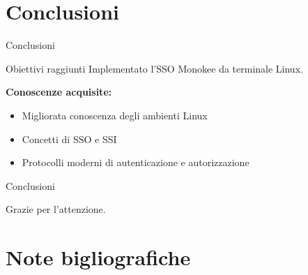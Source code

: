\documentclass{beamer}
\begin{document}
	\section{Conclusioni}
	\begin{frame}{Conclusioni}
		
		\begin{exampleblock}{Obiettivi raggiunti}
			Implementato l'SSO Monokee da terminale Linux.
		\end{exampleblock}
				
		\vspace{.5em} \textbf{Conoscenze acquisite:} \vspace{.5em}
		\begin{itemize}
			\item Migliorata conoscenza degli ambienti Linux \vspace{.5em}
			\item Concetti di SSO e SSI \vspace{.5em}
			\item Protocolli moderni di autenticazione e autorizzazione \vspace{.5em}
		\end{itemize}
	
	\end{frame}
	
	\begin{frame}{Conclusioni}
		
		Grazie per l'attenzione.
	
	\end{frame}
	\section{Note bigliografiche}





\end{document}

